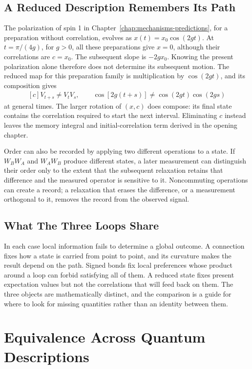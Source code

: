 \documentclass[11pt,oneside]{book}
\newenvironment{centeredalign}{\[\begin{gathered}[c]}{\end{gathered}\]}
\begin{document}
\section{A Reduced Description Remembers Its Path}
The polarization of spin 1 in Chapter~\ref{chap:mechanisms-predictions},
for a preparation without correlation, evolves as
\(x(t)=x_0\cos(2gt)\). At \(t=\pi/(4g)\), for \(g>0\), all
these preparations give \(x=0\), although their correlations are
\(c=x_0\). The subsequent slope is \(-2gx_0\). Knowing the present
polarization alone therefore does not determine its subsequent motion.
The reduced map for this preparation family is multiplication by
\(\cos(2gt)\), and its composition gives
\begin{centeredalign}
V_{t+s}\ne V_tV_s,\qquad
\cos[2g(t+s)]\ne\cos(2gt)\cos(2gs)
\end{centeredalign}
at general times. The larger rotation of \((x,c)\) does compose:
its final state contains the correlation required to start the next
interval. Eliminating \(c\) instead leaves the memory integral and
initial-correlation term derived in the opening chapter.

Order can also be recorded by applying two different operations to a
state. If \(W_BW_A\) and \(W_AW_B\) produce different states, a
later measurement can distinguish their order only to the extent that
the subsequent relaxation retains that difference and the measured
operator is sensitive to it. Noncommuting operations can create a
record; a relaxation that erases the difference, or a measurement
orthogonal to it, removes the record from the observed signal.

\section{What The Three Loops Share}
In each case local information fails to determine a global outcome. A connection fixes how a state is carried from point
to point, and its curvature makes the result depend on the path. Signed bonds fix local preferences whose product around
a loop can forbid satisfying all of them. A reduced state fixes present expectation values but not the correlations that
will feed back on them. The three objects are mathematically distinct, and the comparison is a guide for where to look
for missing quantities rather than an identity between them.


\chapter{Equivalence Across Quantum Descriptions}
\end{document}
